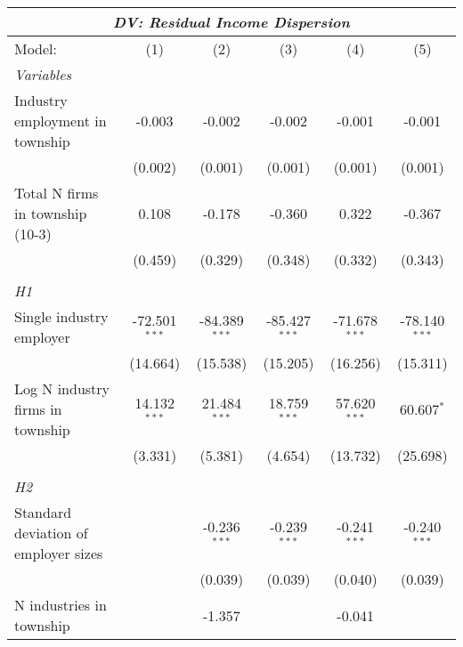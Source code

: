 \begingroup
\centering
\begin{tabular}{lccccc}
   \tabularnewline \multicolumn{6}{c}{\textit{DV: Residual Income Dispersion}} \\ \midrule \midrule
   Model:                               & (1)             & (2)             & (3)             & (4)             & (5)\\  
   \midrule
   \emph{Variables}\\
   Industry employment in township      & -0.003          & -0.002          & -0.002          & -0.001          & -0.001\\   
                                        & (0.002)         & (0.001)         & (0.001)         & (0.001)         & (0.001)\\   
   Total N firms in township (10-3)     & 0.108           & -0.178          & -0.360          & 0.322           & -0.367\\   
                                        & (0.459)         & (0.329)         & (0.348)         & (0.332)         & (0.343)\\   
\hdashline %
\\[0.1ex] %
\emph{H1} \\ 
   Single industry employer             & -72.501$^{***}$ & -84.389$^{***}$ & -85.427$^{***}$ & -71.678$^{***}$ & -78.140$^{***}$\\   
                                        & (14.664)        & (15.538)        & (15.205)        & (16.256)        & (15.311)\\   
   Log N industry firms in township     & 14.132$^{***}$  & 21.484$^{***}$  & 18.759$^{***}$  & 57.620$^{***}$  & 60.607$^{*}$\\   
                                        & (3.331)         & (5.381)         & (4.654)         & (13.732)        & (25.698)\\   
\hdashline %
\\[0.1ex] %
\emph{H2} \\ 
   Standard deviation of employer sizes &                 & -0.236$^{***}$  & -0.239$^{***}$  & -0.241$^{***}$  & -0.240$^{***}$\\   
                                        &                 & (0.039)         & (0.039)         & (0.040)         & (0.039)\\   
   N industries in township             &                 & -1.357          &                 & -0.041          &   \\   

\end{tabular}
